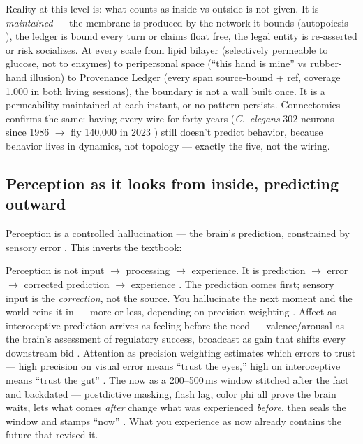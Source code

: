 \documentclass[11pt]{article}
\begin{document}
Reality at this level is: what counts as inside vs outside is not given. It is \emph{maintained} --- the membrane is produced by the network it bounds (autopoiesis \citep{maturana1980}), the ledger is bound every turn or claims float free, the legal entity is re-asserted or risk socializes. At every scale from lipid bilayer (selectively permeable to glucose, not to enzymes) to peripersonal space (``this hand is mine'' vs rubber-hand illusion) to Provenance Ledger (every span source-bound + ref, coverage 1.000 in both living sessions), the boundary is not a wall built once. It is a permeability maintained at each instant, or no pattern persists. Connectomics confirms the same: having every wire for forty years (\emph{C.~elegans} 302 neurons since 1986 \citep{white1986} $\to$\allowbreak{} fly 140,000 in 2023 \citep{dorkenwald2023}) still doesn't predict behavior, because behavior lives in dynamics, not topology --- exactly the five, not the wiring.

\subsection{Perception as it looks from inside, predicting outward}

Perception is a controlled hallucination --- the brain's prediction, constrained by sensory error \citep{seth2021,clark2016surfing}. This inverts the textbook:

Perception is not input $\to$\allowbreak{} processing $\to$\allowbreak{} experience. It is prediction $\to$\allowbreak{} error $\to$\allowbreak{} corrected prediction $\to$\allowbreak{} experience \citep{seth2021}. The prediction comes first; sensory input is the \emph{correction}, not the source. You hallucinate the next moment and the world reins it in --- more or less, depending on precision weighting \citep{clark2016surfing}. Affect as interoceptive prediction arrives as feeling before the need --- valence/arousal as the brain's assessment of regulatory success, broadcast as gain that shifts every downstream bid \citep{seth2021,sofroniew2026}. Attention as precision weighting estimates which errors to trust --- high precision on visual error means ``trust the eyes,'' high on interoceptive means ``trust the gut'' \citep{clark2016surfing}. The now as a 200--500\,ms window stitched after the fact and backdated --- postdictive masking, flash lag, color phi all prove the brain waits, lets what comes \emph{after} change what was experienced \emph{before}, then seals the window and stamps ``now'' \citep{libet1983,wegner2002}. What you experience as now already contains the future that revised it.
\end{document}
